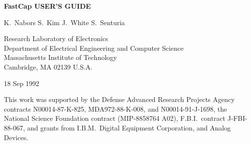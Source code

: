 \begin{titlepage}
\vskip 36pt
\begin{center}
{\bf FastCap USER'S GUIDE}
\end{center}

\vskip 18pt
\begin{center}
\hspace*{1.0in} K.\ Nabors \hfill S.\ Kim \hfill J.\ White \hfill S.\ Senturia \hspace*{1.0in}
\end{center}

\vskip 18pt
\begin{center}
Research Laboratory of Electronics \\
Department of Electrical Engineering and Computer Science \\
Massachusetts Institute of Technology \\
Cambridge, MA  02139 U.S.A.
\end{center}
\vskip 18pt
\begin{center}
18 Sep 1992
\end{center}

\vfill
\noindent This work was supported by the Defense Advanced Research Projects
Agency contracts N00014-87-K-825, MDA972-88-K-008, and  N00014-91-J-1698,
the National Science Foundation contract (MIP-8858764 A02),
F.B.I.\ contract J-FBI-88-067, and grants from I.B.M.\,
Digital Equipment Corporation, and Analog Devices.
\end{titlepage}

\begin{titlepage}
$\;$
\end{titlepage}





\tableofcontents
\cleardoublepage

\setcounter{page}{1}





\appendix




